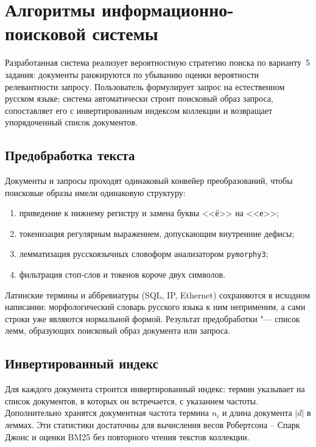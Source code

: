 \section{Алгоритмы информационно-поисковой системы}
\label{sec:algorithms}

Разработанная система реализует вероятностную стратегию поиска по варианту~5 задания: документы ранжируются по убыванию оценки вероятности релевантности запросу. Пользователь формулирует запрос на естественном русском языке; система автоматически строит поисковый образ запроса, сопоставляет его с инвертированным индексом коллекции и возвращает упорядоченный список документов.

\subsection{Предобработка текста}

Документы и запросы проходят одинаковый конвейер преобразований, чтобы поисковые образы имели одинаковую структуру:

\begin{enumerate}
	\item приведение к нижнему регистру и замена буквы <<ё>> на <<е>>;
	\item токенизация регулярным выражением, допускающим внутренние дефисы;
	\item лемматизация русскоязычных словоформ анализатором \texttt{pymorphy3};
	\item фильтрация стоп-слов и токенов короче двух символов.
\end{enumerate}

Латинские термины и аббревиатуры (SQL, IP, Ethernet) сохраняются в исходном написании: морфологический словарь русского языка к ним неприменим, а сами строки уже являются нормальной формой. Результат предобработки "--- список лемм, образующих поисковый образ документа или запроса.

\subsection{Инвертированный индекс}

Для каждого документа строится инвертированный индекс: термин указывает на список документов, в которых он встречается, с указанием частоты. Дополнительно хранятся документная частота термина $n_i$ и длина документа $|d|$ в леммах. Эти статистики достаточны для вычисления весов Робертсона -- Спарк Джонс и оценки BM25 без повторного чтения текстов коллекции.

